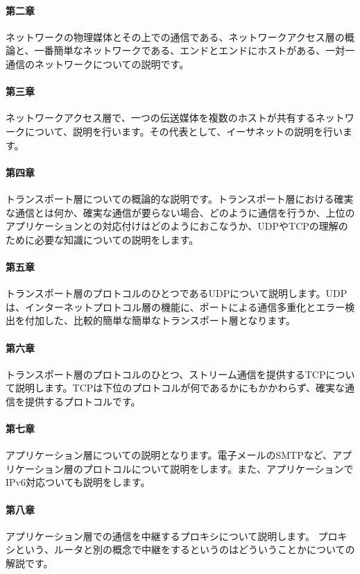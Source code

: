 \paragraph{第二章}
ネットワークの物理媒体とその上での通信である、ネットワークアクセス層の概論と、一番簡単なネットワークである、エンドとエンドにホストがある、一対一通信のネットワークについての説明です。

\paragraph{第三章}
ネットワークアクセス層で、一つの伝送媒体を複数のホストが共有するネットワークについて、説明を行います。その代表として、イーサネットの説明を行います。

\paragraph{第四章}
トランスポート層についての概論的な説明です。トランスポート層における確実な通信とは何か、確実な通信が要らない場合、どのように通信を行うか、上位のアプリケーションとの対応付けはどのようにおこなうか、UDPやTCPの理解のために必要な知識についての説明をします。

\paragraph{第五章}
トランスポート層のプロトコルのひとつであるUDPについて説明します。UDPは、インターネットプロトコル層の機能に、ポートによる通信多重化とエラー検出を付加した、比較的簡単な簡単なトランスポート層となります。

\paragraph{第六章}
トランスポート層のプロトコルのひとつ、ストリーム通信を提供するTCPについて説明します。TCPは下位のプロトコルが何であるかにもかかわらず、確実な通信を提供するプロトコルです。

\paragraph{第七章}
アプリケーション層についての説明となります。電子メールのSMTPなど、アプリケーション層のプロトコルについて説明をします。また、アプリケーションでIPv6対応ついても説明をします。

\paragraph{第八章}
アプリケーション層での通信を中継するプロキシについて説明します。
プロキシという、ルータと別の概念で中継をするというのはどういうことかについての解説です。


